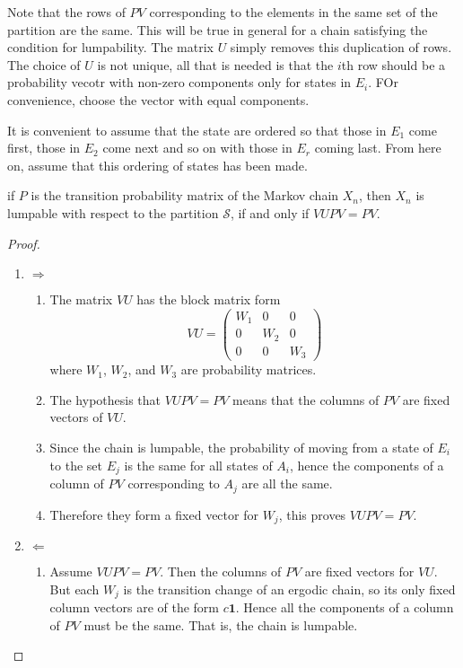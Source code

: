 \documentclass[12pt]{article}
\begin{document}
Note that the rows of $PV$ corresponding to the elements in the same
set of the partition are the same.  This will be true in general for a
chain satisfying the condition for lumpability.  The matrix $U$ simply
removes this duplication of rows.  The choice of $U$ is not unique,
all that is needed is that the $i$th row should be a probability
vecotr with non-zero components only for states in $E_i$.  FOr
convenience, choose the vector with equal components.

It is convenient to assume that the state are ordered so that those
in $E_1$ come first, those in $E_{2}$ come next and so on with those
in $E_r$ coming last.  From here on, assume that this ordering of
states has been made.


\begin{theorem}
  if $P$ is the transition probability matrix of the Markov chain
$X_n$, then $X_n$ is lumpable with respect to the partition $\mathcal{S}$, if and only if
\( VUPV = PV \).
\end{theorem}

\begin{proof}
  \begin{enumerate}
  \item $\Rightarrow$
    \begin{enumerate}
    \item The matrix $VU$ has the block matrix form
      \[
        VU =
        \begin{pmatrix}
          W_1 & 0 & 0 \\
          0   & W_2 & 0 \\
          0   & 0   & W_3
        \end{pmatrix}
      \]
      where $W_1$, $W_2$, and $W_3$ are probability matrices.
    \item The hypothesis that \( VUPV = PV \) means that the columns
      of $PV$ are fixed vectors of $VU$.
    \item Since the chain is lumpable, the probability of moving from a
      state of $E_i$ to the set $E_j$ is the same for all states of
      $A_i$, hence the components of a column of $PV$ corresponding to
      $A_j$ are all the same.
    \item Therefore they form a fixed vector for $W_j$, this proves
      \(VUPV = PV \).
    \end{enumerate}
  \item $\Leftarrow$
    \begin{enumerate}
    \item Assume \(VUPV = PV \).  Then the columns of $PV$ are fixed
      vectors for $VU$.  But each $W_j$ is the transition change of an
      ergodic chain, so its only fixed column vectors are of the form
      $c \mathbf{1}$.  Hence all the components of a column of $PV$ must be
      the same.  That is, the chain is lumpable.
    \end{enumerate}
  \end{enumerate}
\end{proof}
\end{document}
